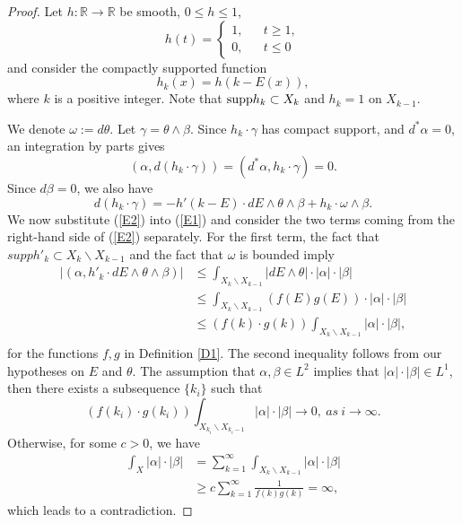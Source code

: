\documentclass[12pt, twoside]{article}
\theoremstyle{definition}
\numberwithin{equation}{section}
\def \a {\alpha }
\def \b {\beta}
\def\w {\omega}
\begin{document}
	\begin{proof}
		Let $h:\mathbb{R}\rightarrow\mathbb{R}$ be smooth, $0\leq h\leq1$,
		$$
		h(t)=\left\{
		\begin{aligned}
		1, &  & t\geq 1, \\
		0, &  & t\leq 0
		\end{aligned}
		\right.
		$$
		and consider the compactly supported function
		$$h_{k}(x)=h(k-E(x)),$$
		where $k$ is a positive integer. Note that ${\rm{supp}}h_{k}\subset X_{k}$ and $h_{k}=1$ on $X_{k-1}$.
		
		We denote $\w:=d\theta$. Let $\gamma=\theta\wedge\b$. Since $h_{k}\cdot\gamma$ has compact support, 
		and $d^{\ast}\a=0$, an integration by parts gives
		\begin{equation} \label{E1}
		(\a,d(h_{k}\cdot\gamma))=(d^{\ast}\a,h_{k}\cdot\gamma )=0.
		\end{equation}
		Since $d\b=0$, we also have
		\begin{equation} \label{E2}
		d(h_{k}\cdot\gamma)=-h'(k-E)\cdot dE\wedge\theta\wedge\b+h_{k}\cdot\w\wedge\b.
		\end{equation}
		We now substitute (\ref{E2}) into (\ref{E1}) and consider the two terms coming from the right-hand side of (\ref{E2}) separately. For the first term, the fact that $supp h'_{k}\subset X_{k}\backslash X_{k-1}$ and the fact that $\w$ is bounded imply 
		\begin{equation}\label{E3}
		\begin{split}
		|(\a,h'_k\cdot dE\wedge\theta\wedge\b)|&\leq\int_{ X_{k}\backslash X_{k-1}}|dE\wedge\theta|\cdot|\a|\cdot|\b|\\
		&\leq\int_{ X_{k}\backslash X_{k-1}}(f(E)g(E))\cdot|\a|\cdot|\b|\\
		&\leq (f(k)\cdot g(k))\int_{ X_{k}\backslash X_{k-1}}|\a|\cdot|\b|,\\
		\end{split}
		\end{equation}
		for the functions $f,g$ in Definition \ref{D1}. The second inequality follows from our hypotheses on $E$ and $\theta$. The assumption that $\a,\b\in L^{2}$ implies that $|\a|\cdot|\b|\in L^{1}$, then there exists a subsequence $\{k_{i}\}$ such that
		\begin{equation}\label{E4}
		(f(k_{i})\cdot g(k_{i}))\int_{ X_{k_{i}}\backslash X_{k_{i}-1}}|\a|\cdot|\b|\rightarrow0,\ as\ i\rightarrow\infty.
		\end{equation}
		Otherwise, for some $c>0$, we have
		\begin{equation*}
		\begin{split}
		\int_{X}|\a|\cdot|\b|&=\sum_{k=1}^{\infty}\int_{ X_{k}\backslash X_{k-1}}|\a|\cdot|\b|\\
		&\geq c\sum_{k=1}^{\infty}\frac{1}{f(k)g(k)}
		=\infty,
		\end{split}
		\end{equation*}
		which leads to a contradiction.
		

\end{proof}
\end{document}
